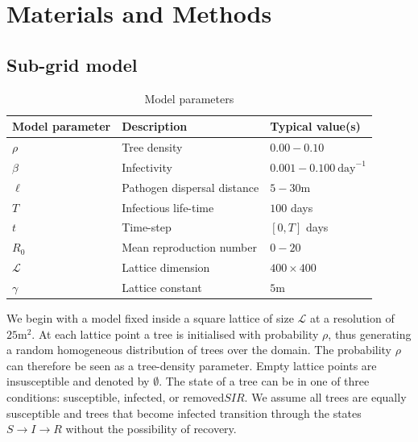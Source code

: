 \section{Materials and Methods}
\label{section:M-and-M}
\subsection{Sub-grid model}
\label{section:sgm-expo}
\begin{table}[h]
\centering
\begin{tabular}{l l l}
\hline
\textbf{Model parameter} & \textbf{Description} & \textbf{Typical value(s)}\\
\hline
$\rho$  & Tree density & $0.00 - 0.10$ \\ 
$\beta$ & Infectivity & $0.001 - 0.100\ \mathrm{day}^{-1}$ \\
$\ell$ & Pathogen dispersal distance & $5-30\mathrm{m}$ \\
$T$ & Infectious life-time & $100$ days \\
$t$ & Time-step & $[0, T]$ days\\
$R_0$ & Mean reproduction number & $0-20$ \\
$\mathcal{L}$ & Lattice dimension & $400\times400$ \\
$\gamma$ & Lattice constant & $5\mathrm{m}$ \\
\hline
\end{tabular}
\caption{Model parameters}
\end{table}

We begin with a model fixed inside a square lattice of size $\mathcal{L}$ at a resolution of $\mathrm{25m^2}$. At each lattice point a tree is initialised with probability $\rho$, thus generating a random homogeneous distribution of trees over the domain. The probability $\rho$ can therefore be seen as a tree-density parameter. Empty lattice points are insusceptible and denoted by $\emptyset$. The state of a tree can be in one of three conditions: susceptible, infected, or removed\textemdash $SIR$. We assume all trees are equally susceptible and trees that become infected transition through the states $S\rightarrow I\rightarrow R$ without the possibility of recovery.\\

